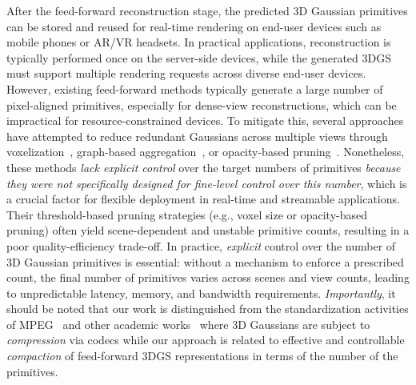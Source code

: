 After the feed-forward reconstruction stage, the predicted 3D Gaussian primitives can be stored and reused for real-time rendering on end-user devices such as mobile phones or AR/VR headsets. In practical applications, reconstruction is typically performed once on the server-side devices, while the generated 3DGS must support multiple rendering requests across diverse end-user devices. However, existing feed-forward methods typically generate a large number of pixel-aligned primitives, especially for dense-view reconstructions, which can be impractical for resource-constrained devices. To mitigate this, several approaches~\cite{jiang2025anysplat, zhang2024gaussian, ziwen2025long} have attempted to reduce redundant Gaussians across multiple views through voxelization~\cite{jiang2025anysplat}, graph-based aggregation~\cite{zhang2024gaussian}, or opacity-based pruning~\cite{ziwen2025long}. Nonetheless, these methods \textit{lack explicit control} over the target numbers of primitives \textit{because they were not specifically designed for fine-level control over this number}, which is a crucial factor for flexible deployment in real-time and streamable applications. Their threshold-based pruning strategies (e.g., voxel size or opacity-based pruning) often yield scene-dependent and unstable primitive counts, resulting in a poor quality-efficiency trade-off. In practice, \textit{explicit} control over the number of 3D Gaussian primitives is essential: without a mechanism to enforce a prescribed count, the final number of primitives varies across scenes and view counts, leading to unpredictable latency, memory, and bandwidth requirements. \textit{Importantly}, it should be noted that our work is distinguished from the standardization activities of MPEG~\cite{ISO2025} and other academic works~\cite{song2025tinysplat, chen2024fast} where 3D Gaussians are subject to \textit{compression} via codecs while our approach is related to effective and controllable \textit{compaction} of feed-forward 3DGS representations in terms of the number of the primitives.

